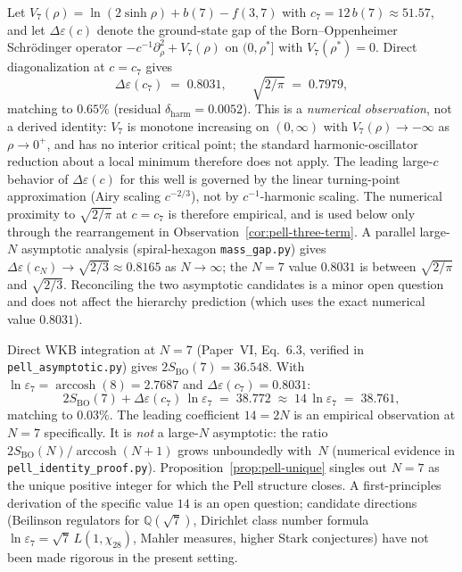 \begin{observation}
\label{prop:harmonic-wdw-gap}
Let $V_7(\rho) = \ln(2\sinh\rho) + b(7) - f(3,7)$ with
$c_7 = 12\,b(7) \approx 51.57$, and let
$\Delta\varepsilon(c)$ denote the ground-state gap of the
Born--Oppenheimer Schr\"odinger operator
$-c^{-1}\partial_\rho^2 + V_7(\rho)$ on $(0,\rho^*]$
with $V_7(\rho^*) = 0$.
Direct diagonalization at $c = c_7$ gives
\[
  \Delta\varepsilon(c_7) \;=\; 0.8031,
  \qquad \sqrt{2/\pi} \;=\; 0.7979,
\]
matching to $0.65\%$ (residual $\delta_{\mathrm{harm}}
= 0.0052$).
This is a \emph{numerical observation}, not a derived identity:
$V_7$ is monotone increasing on $(0,\infty)$ with
$V_7(\rho) \to -\infty$ as $\rho \to 0^+$, and has no
interior critical point; the standard harmonic-oscillator
reduction about a local minimum therefore does not apply.
The leading large-$c$ behavior of $\Delta\varepsilon(c)$ for
this well is governed by the linear turning-point
approximation (Airy scaling $c^{-2/3}$), not by
$c^{-1}$-harmonic scaling.
The numerical proximity to $\sqrt{2/\pi}$ at $c = c_7$ is
therefore empirical, and is used below only through the
rearrangement in Observation~\ref{cor:pell-three-term}.
A parallel large-$N$ asymptotic analysis (spiral-hexagon
\texttt{mass\_gap.py}) gives $\Delta\varepsilon(c_N) \to
\sqrt{2/3} \approx 0.8165$ as $N \to \infty$; the $N = 7$
value $0.8031$ is between $\sqrt{2/\pi}$ and $\sqrt{2/3}$.
Reconciling the two asymptotic candidates is a minor open
question and does not affect the hierarchy prediction
(which uses the exact numerical value $0.8031$).
\end{observation}

\begin{observation}[Pell-unit numerical identity at $N = 7$]
\label{obs:pell-numerical}
Direct WKB integration at $N = 7$
(Paper~VI, Eq.~6.3, verified in
\texttt{pell\_asymptotic.py}) gives
$2S_{\mathrm{BO}}(7) = 36.548$.
With $\ln\varepsilon_7 = \operatorname{arccosh}(8) = 2.7687$
and $\Delta\varepsilon(c_7) = 0.8031$:
\begin{equation}\label{eq:pell-numerical}
  2S_{\mathrm{BO}}(7) + \Delta\varepsilon(c_7)\,\ln\varepsilon_7
  \;=\; 38.772 \;\approx\; 14\,\ln\varepsilon_7 \;=\; 38.761,
\end{equation}
matching to $0.03\%$.
The leading coefficient $14 = 2N$ is an empirical
observation at $N = 7$ specifically.
It is \emph{not} a large-$N$ asymptotic:
the ratio $2S_{\mathrm{BO}}(N)/\operatorname{arccosh}(N{+}1)$
grows unboundedly with~$N$ (numerical evidence in
\texttt{pell\_identity\_proof.py}).
Proposition~\ref{prop:pell-unique} singles out $N = 7$ as the
unique positive integer for which the Pell structure closes.
A first-principles derivation of the specific value $14$ is
an open question; candidate directions
(Beilinson regulators for $\mathbb{Q}(\sqrt{7})$, Dirichlet
class number formula $\ln\varepsilon_7 =
\sqrt{7}\,L(1,\chi_{28})$, Mahler measures, higher Stark
conjectures) have not been made rigorous in the present
setting.
\end{observation}

